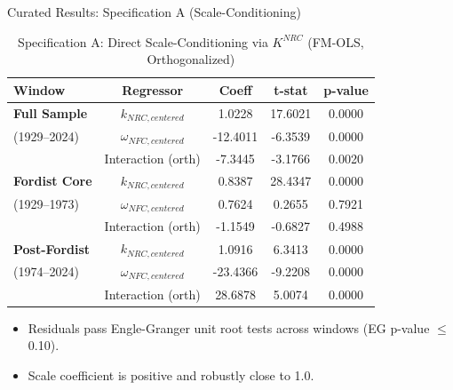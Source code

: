 \documentclass[10pt]{beamer}
\begin{document}
\begin{frame}{Curated Results: Specification A (Scale-Conditioning)}
  \begin{table}[htbp]
    \centering
    \caption{Specification A: Direct Scale-Conditioning via $K^{NRC}$ (FM-OLS, Orthogonalized)}
    \begin{tabular}{lcccc}
      \toprule
      \textbf{Window} & \textbf{Regressor} & \textbf{Coeff} & \textbf{t-stat} & \textbf{p-value} \\
      \midrule
      \textbf{Full Sample} & $k_{NRC, centered}$ & 1.0228 & 17.6021 & 0.0000 \\
      (1929--2024) & $\omega_{NFC, centered}$ & -12.4011 & -6.3539 & 0.0000 \\
      & Interaction (orth) & -7.3445 & -3.1766 & 0.0020 \\
      \midrule
      \textbf{Fordist Core} & $k_{NRC, centered}$ & 0.8387 & 28.4347 & 0.0000 \\
      (1929--1973) & $\omega_{NFC, centered}$ & 0.7624 & 0.2655 & 0.7921 \\
      & Interaction (orth) & -1.1549 & -0.6827 & 0.4988 \\
      \midrule
      \textbf{Post-Fordist} & $k_{NRC, centered}$ & 1.0916 & 6.3413 & 0.0000 \\
      (1974--2024) & $\omega_{NFC, centered}$ & -23.4366 & -9.2208 & 0.0000 \\
      & Interaction (orth) & 28.6878 & 5.0074 & 0.0000 \\
      \bottomrule
    \end{tabular}
  \end{table}
  \begin{itemize}
    \item Residuals pass Engle-Granger unit root tests across windows (EG p-value $\le$ 0.10).
    \item Scale coefficient is positive and robustly close to 1.0.
  \end{itemize}
\end{frame}
\end{document}
